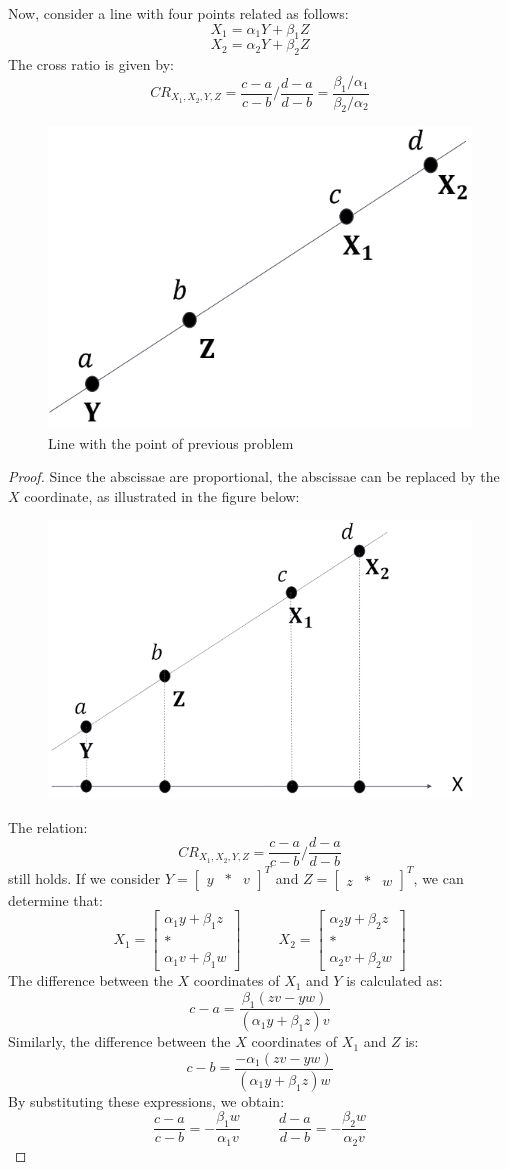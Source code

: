 Now, consider a line with four points related as follows:
\[X_1=\alpha_1Y+\beta_1Z\]
\[X_2=\alpha_2Y+\beta_2Z\]
The cross ratio is given by:
\[CR_{X_1,X_2,Y,Z}=\dfrac{c-a}{c-b}/\dfrac{d-a}{d-b}=\dfrac{\beta_1/\alpha_1}{\beta_2/\alpha_2}\]
\begin{figure}[H]
    \centering
    \includegraphics[width=0.25\linewidth]{images/line.png}
    \caption{Line with the point of previous problem}
\end{figure}
\begin{proof}
    Since the abscissae are proportional, the abscissae can be replaced by the $X$ coordinate, as illustrated in the figure below:
    \begin{figure}[H]
        \centering
        \includegraphics[width=0.3\linewidth]{images/abscissae.png}
    \end{figure}
    The relation:
    \[CR_{X_1,X_2,Y,Z}=\dfrac{c-a}{c-b}/\dfrac{d-a}{d-b}\]
    still holds. 
    If we consider $Y={\begin{bmatrix} y & * & v \end{bmatrix}}^T$ and $Z={\begin{bmatrix} z & * & w \end{bmatrix}}^T$, we can determine that:
    \[ X_1=\begin{bmatrix} \alpha_1y+\beta_1z \\ * \\ \alpha_1v+\beta_1w \end{bmatrix} \:\:\:\:\:\:\:\:\:\:\:\: X_2=\begin{bmatrix} \alpha_2y+\beta_2z \\ * \\ \alpha_2v+\beta_2w \end{bmatrix}\]
    The difference between the $X$ coordinates of $X_1$ and $Y$ is calculated as:
    \[c-a=\dfrac{\beta_1(zv-yw)}{(\alpha_1y+\beta_1z)v}\]
    Similarly, the difference between the $X$ coordinates of $X_1$ and $Z$ is:
    \[c-b=\dfrac{-\alpha_1(zv-yw)}{(\alpha_1y+\beta_1z)w}\]
    By substituting these expressions, we obtain:
    \[ \dfrac{c-a}{c-b}=-\dfrac{\beta_1w}{\alpha_1v} \:\:\:\:\:\:\:\:\:\:\:\: \dfrac{d-a}{d-b}=-\dfrac{\beta_2w}{\alpha_2v}\]
\end{proof}